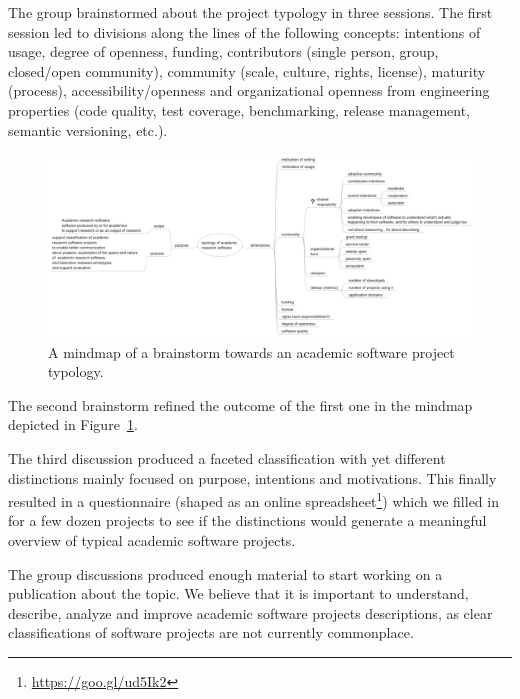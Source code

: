 \documentclass[a4paper,UKenglish]{dagrep}
\begin{document}
The group brainstormed about the project typology in three sessions. The first session led to divisions along the lines of the following concepts: intentions of usage,
degree of openness,
funding,
contributors (single person, group, closed/open community),
community (scale, culture, rights, license),
maturity (process),
accessibility/openness and
organizational openness from engineering properties
(code quality,
test coverage,
benchmarking,
release management,
semantic versioning, etc.).

\begin{figure}[t]
\includegraphics[width=\textwidth]{mindmap2}
\caption{A mindmap of a brainstorm towards an academic software project typology.\label{fig:ontologymap}}
\end{figure}
The second brainstorm refined the outcome of the first one in the mindmap depicted in Figure~\ref{fig:ontologymap}.


The third discussion produced a faceted classification with yet different distinctions mainly focused on purpose, intentions and motivations. This finally resulted in a questionnaire (shaped as an online spreadsheet\footnote{\url{https://goo.gl/ud5Ik2}}) which we filled in for a few dozen projects to see if the distinctions would generate a meaningful overview of typical academic software projects.

The group discussions produced enough material to start working on a publication about the topic. We believe that it is important to understand, describe, analyze and improve academic software projects descriptions, as  clear classifications of software projects are not currently commonplace.


\end{document}
